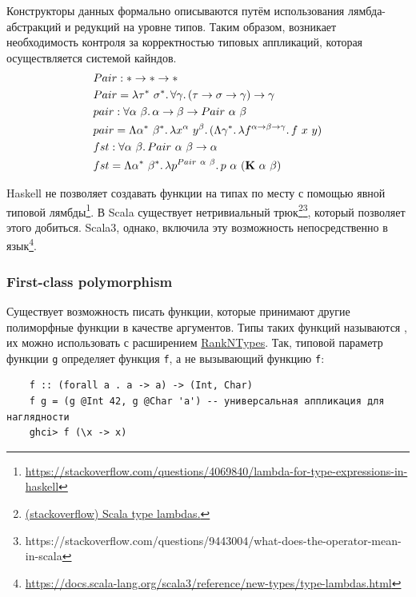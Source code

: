 Конструкторы данных формально описываются путём использования лямбда-абстракций и редукций на уровне типов.
Таким образом, возникает необходимость контроля за корректностью типовых аппликаций, которая осуществляется системой кайндов.
\begin{align*}
    &Pair : * \rightarrow * \rightarrow * \\
    &Pair = \lambda \tau^*~\sigma^*\ldotp\forall \gamma\ldotp(\tau\rightarrow\sigma\rightarrow\gamma)\to\gamma \\
    &pair : \forall \alpha~\beta\ldotp\alpha \rightarrow \beta \rightarrow Pair~\alpha~\beta \\
    &pair = \Lambda \alpha^*~\beta^*\ldotp\lambda x^\alpha~y^\beta\ldotp(\Lambda \gamma^*\ldotp\lambda f^{\alpha\rightarrow\beta\rightarrow\gamma}\ldotp f~x~y) \\
    &fst : \forall \alpha~\beta\ldotp Pair~\alpha~\beta\rightarrow \alpha \\
    &fst = \Lambda \alpha^*~\beta^*\ldotp\lambda p^{Pair~\alpha~\beta}\ldotp p~\alpha~(\mathbf{K}~\alpha~\beta)
\end{align*}

Haskell не позволяет создавать функции на типах по месту с помощью явной типовой лямбды\footnote{\url{https://stackoverflow.com/questions/4069840/lambda-for-type-expressions-in-haskell}}.
В Scala существует нетривиальный трюк\footnote{\href{https://stackoverflow.com/questions/8736164/what-are-type-lambdas-in-scala-and-what-are-their-benefits}{(stackoverflow) Scala type lambdas.}}\footnote{https://stackoverflow.com/questions/9443004/what-does-the-operator-mean-in-scala}, который позволяет этого добиться.
Scala3, однако, включила эту возможность непосредственно в язык\footnote{\url{https://docs.scala-lang.org/scala3/reference/new-types/type-lambdas.html}}.

\subsubsection{First-class polymorphism}

Существует возможность писать функции, которые принимают другие полиморфные функции в качестве аргументов.
Типы таких функций называются , их можно использовать с расширением \href{https://downloads.haskell.org/ghc/latest/docs/users_guide/exts/rank_polymorphism.html}{RankNTypes}.
Так, типовой параметр функции \texttt{g} определяет функция \texttt{f}, а не вызывающий функцию \texttt{f}:
\begin{verbatim}
    f :: (forall a . a -> a) -> (Int, Char)
    f g = (g @Int 42, g @Char 'a') -- универсальная аппликация для наглядности
    ghci> f (\x -> x)
\end{verbatim}

